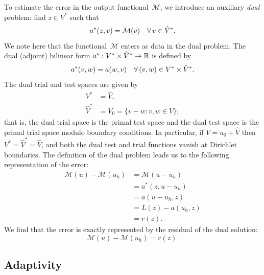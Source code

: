 To estimate the error in the output functional~$\mathcal{M}$, we
introduce an auxiliary \emph{dual} problem: find $z \in V^*$ such that
\begin{equation} \label{eq:varproblem,dual}
  a^*(z, v) = \mathcal{M}(v) \quad \forall\, v \in \hat{V}^*.
\end{equation}
We note here that the functional~$\mathcal{M}$ enters as data in the
dual problem. The dual (adjoint) bilinear form $a^* : V^* \times
\hat{V}^* \rightarrow \mathbb{R}$ is defined by
\begin{equation}
  a^*(v, w) = a(w, v) \quad \forall\, (v, w) \in V^* \times \hat{V}^*.
\end{equation}
The dual trial and test spaces are given by
\begin{equation}
  \begin{split}
    V^* &= \hat{V},
    \\
    \hat{V}^* &= V_0 = \{v - w : v, w \in V\};
  \end{split}
\end{equation}
that is, the dual trial space is the primal test space and the dual
test space is the primal trial space modulo boundary conditions. In
particular, if $V = u_0 + \hat{V}$ then
$V^* = \hat{V}^* = \hat{V}$, and both the dual test and trial
functions vanish at Dirichlet boundaries. The definition of the dual
problem leads us to the following representation of the error:
\begin{equation}
  \begin{split}
    \mathcal{M}(u) - \mathcal{M}(u_h)
    &= \mathcal{M}(u - u_h)
    \\
    &= a^*(z, u - u_h)
    \\
    &= a(u - u_h, z)
    \\
    &= L(z) - a(u_h, z)
    \\
    &= r(z).
  \end{split}
\end{equation}
We find that the error is exactly represented by the residual of the
dual solution:
\begin{equation} \label{eq:aposteriori,dual}
  \mathcal{M}(u) - \mathcal{M}(u_h) = r(z).
\end{equation}

\subsection{Adaptivity}

